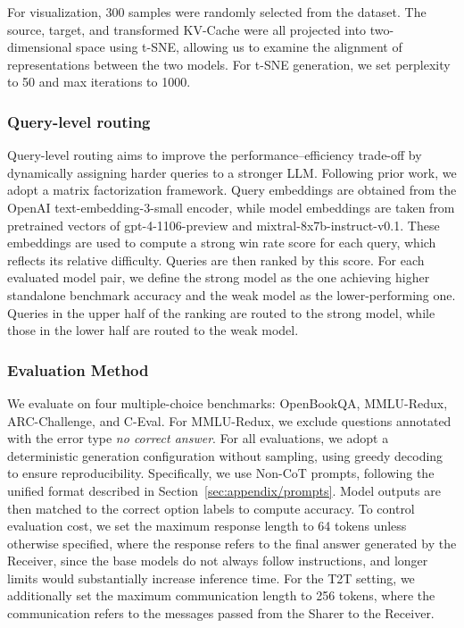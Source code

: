 For visualization, 300 samples were randomly selected from the dataset. The source, target, and transformed KV-Cache were all projected into two-dimensional space using t-SNE, allowing us to examine the alignment of representations between the two models. For t-SNE generation, we set perplexity to 50 and max iterations to 1000.

\subsubsection{Query-level routing}

Query-level routing aims to improve the performance–efficiency trade-off by dynamically assigning harder queries to a stronger LLM. Following prior work, we adopt a matrix factorization framework. Query embeddings are obtained from the OpenAI text-embedding-3-small encoder, while model embeddings are taken from pretrained vectors of gpt-4-1106-preview and mixtral-8x7b-instruct-v0.1. These embeddings are used to compute a strong win rate score for each query, which reflects its relative difficulty. Queries are then ranked by this score. For each evaluated model pair, we define the strong model as the one achieving higher standalone benchmark accuracy and the weak model as the lower-performing one. Queries in the upper half of the ranking are routed to the strong model, while those in the lower half are routed to the weak model.

\subsubsection{Evaluation Method}
\label{sec:appendix/setup/eval}

 We evaluate \name on four multiple-choice benchmarks: OpenBookQA, MMLU-Redux, ARC-Challenge, and C-Eval. For MMLU-Redux, we exclude questions annotated with the error type \textit{no correct answer}. For all evaluations, we adopt a deterministic generation configuration without sampling, using greedy decoding to ensure reproducibility. Specifically, we use Non-CoT prompts, following the unified format described in Section~\ref{sec:appendix/prompts}. Model outputs are then matched to the correct option labels to compute accuracy. To control evaluation cost, we set the maximum response length to 64 tokens unless otherwise specified, where the response refers to the final answer generated by the Receiver, since the base models do not always follow instructions, and longer limits would substantially increase inference time. For the T2T setting, we additionally set the maximum communication length to 256 tokens, where the communication refers to the messages passed from the Sharer to the Receiver.

